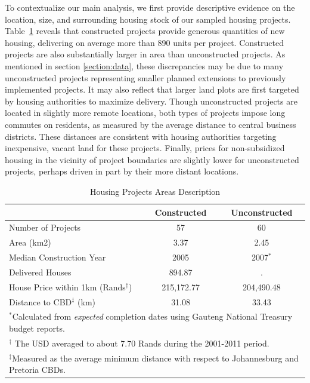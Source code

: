 \documentclass[12pt]{article}
\begin{document}
To contextualize our main analysis, we first provide descriptive evidence on the location, size, and surrounding housing stock of our  sampled housing projects. Table~\ref{table:projectdescriptives} reveals that constructed projects provide generous quantities of new housing, delivering on average more than 890 units per project. Constructed projects are also substantially larger in area than unconstructed projects. As mentioned in section \ref{section:data}, these discrepancies may be due to many unconstructed projects representing smaller planned extensions to previously implemented projects. It may also reflect that larger land plots are first targeted by housing authorities to maximize delivery. Though unconstructed projects are located in slightly more remote locations, both types of projects impose long commutes on residents, as measured by the average distance to central business districts. These distances are consistent with housing authorities targeting inexpensive, vacant land for these projects. Finally, prices for non-subsidized housing in the vicinity of project boundaries are slightly lower for unconstructed projects, perhaps driven in part by their more distant locations.

\vspace{0mm}
\begin{table}[h!]
\centering
\caption{Housing Projects Areas Description}\label{table:projectdescriptives}
\vspace{0mm}
\begin{tabular}{l*{1}{cc}}
\toprule
  &Constructed &Unconstructed \\
\midrule
Number of Projects  &       57 &       60 \\
Area (km2) &       3.37 &       2.45  \\
Median Construction Year & 2005 & 2007$^*$\\
Delivered Houses  &     894.87 & .      \\
House Price within 1km (Rands$^\dagger$) &   215,172.77   &   204,490.48   \\
Distance to CBD$^\ddagger$ (km) &  31.08  &     33.43   \\
\bottomrule
\multicolumn{3}{l}{\scriptsize $^*$Calculated from {\it expected} completion dates using Gauteng National Treasury budget reports.}\\[-.5em]
\multicolumn{3}{l}{\scriptsize $^\dagger$ The USD averaged to about 7.70 Rands during the 2001-2011 period.}\\[-.5em]
\multicolumn{3}{l}{\scriptsize $^\ddagger$Measured as the average minimum distance with respect to Johannesburg and Pretoria CBDs. }
\end{tabular}
\end{table} 
\end{document}
